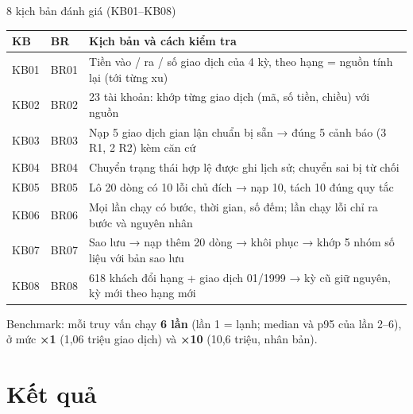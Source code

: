 \documentclass[aspectratio=169,11pt]{beamer}
\begin{document}
\begin{frame}{8 kịch bản đánh giá (KB01--KB08)}
  \footnotesize
  \begin{tabular}{l l L{10.4cm}}
    \toprule
    \textbf{KB} & \textbf{BR} & \textbf{Kịch bản và cách kiểm tra} \\
    \midrule
    KB01 & BR01 & Tiền vào / ra / số giao dịch của 4 kỳ, theo hạng = nguồn tính lại (tới từng xu) \\
    KB02 & BR02 & 23 tài khoản: khớp từng giao dịch (mã, số tiền, chiều) với nguồn \\
    KB03 & BR03 & Nạp 5 giao dịch gian lận chuẩn bị sẵn → đúng 5 cảnh báo (3 R1, 2 R2) kèm căn cứ \\
    KB04 & BR04 & Chuyển trạng thái hợp lệ được ghi lịch sử; chuyển sai bị từ chối \\
    KB05 & BR05 & Lô 20 dòng có 10 lỗi chủ đích → nạp 10, tách 10 đúng quy tắc \\
    KB06 & BR06 & Mọi lần chạy có bước, thời gian, số đếm; lần chạy lỗi chỉ ra bước và nguyên nhân \\
    KB07 & BR07 & Sao lưu → nạp thêm 20 dòng → khôi phục → khớp 5 nhóm số liệu với bản sao lưu \\
    KB08 & BR08 & 618 khách đổi hạng + giao dịch 01/1999 → kỳ cũ giữ nguyên, kỳ mới theo hạng mới \\
    \bottomrule
  \end{tabular}
  \medskip

  \small Benchmark: mỗi truy vấn chạy \textbf{6 lần} (lần 1 = lạnh; median và p95 của lần 2--6), ở mức \textbf{×1} (1,06 triệu giao dịch) và \textbf{×10} (10,6 triệu, nhân bản).
\end{frame}

\section{Kết quả}
\end{document}
